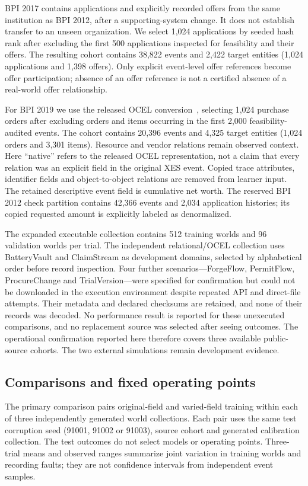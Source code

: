\documentclass[11pt]{article}
\begin{document}
BPI 2017 contains applications and explicitly recorded offers from the same institution as BPI 2012, after a supporting-system change. It does not establish transfer to an unseen organization. We select 1,024 applications by seeded hash rank after excluding the first 500 applications inspected for feasibility and their offers. The resulting cohort contains 38,822 events and 2,422 target entities (1,024 applications and 1,398 offers). Only explicit event-level offer references become offer participation; absence of an offer reference is not a certified absence of a real-world offer relationship.

For BPI 2019 we use the released OCEL conversion~\cite{bpiconversion,bpiocel}, selecting 1,024 purchase orders after excluding orders and items occurring in the first 2,000 feasibility-audited events. The cohort contains 20,396 events and 4,325 target entities (1,024 orders and 3,301 items). Resource and vendor relations remain observed context. Here ``native'' refers to the released OCEL representation, not a claim that every relation was an explicit field in the original XES event. Copied trace attributes, identifier fields and object-to-object relations are removed from learner input. The retained descriptive event field is cumulative net worth. The reserved BPI 2012 check partition contains 42,366 events and 2,034 application histories; its copied requested amount is explicitly labeled as denormalized.

The expanded executable collection contains 512 training worlds and 96 validation worlds per trial. The independent relational/OCEL collection uses BatteryVault and ClaimStream as development domains, selected by alphabetical order before record inspection. Four further scenarios---ForgeFlow, PermitFlow, ProcureChange and TrialVersion---were specified for confirmation but could not be downloaded in the execution environment despite repeated API and direct-file attempts. Their metadata and declared checksums are retained, and none of their records was decoded. No performance result is reported for these unexecuted comparisons, and no replacement source was selected after seeing outcomes. The operational confirmation reported here therefore covers three available public-source cohorts. The two external simulations remain development evidence.

\subsection{Comparisons and fixed operating points}
The primary comparison pairs original-field and varied-field training within each of three independently generated world collections. Each pair uses the same test corruption seed (91001, 91002 or 91003), source cohort and generated calibration collection. The test outcomes do not select models or operating points. Three-trial means and observed ranges summarize joint variation in training worlds and recording faults; they are not confidence intervals from independent event samples.
\end{document}
